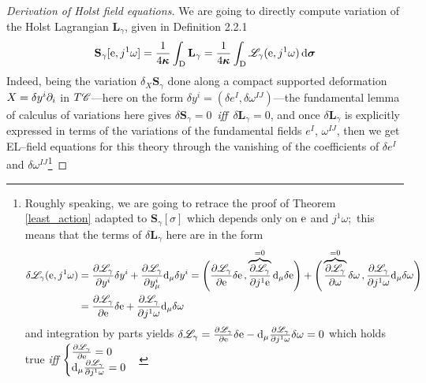 \begin{proof}[Derivation of Holst field equations]
    We are going to directly compute variation of the Holst Lagrangian $\mathbf{L}_\gamma$, given in Definition 2.2.1
    $$\mathbf{S}_\gamma[\text{\normalfont e},j^1\omega]=\frac{1}{4\boldsymbol{\kappa}}\int_{\text{\normalfont D}}\mathbf{L}_\gamma=\frac{1}{4\boldsymbol{\kappa}}\int_{\text{\normalfont D}}\mathscr{L}_\gamma(\text{\normalfont e},j^1\omega)\,\text{\normalfont d}\boldsymbol{\sigma}$$
    Indeed, being the variation $\delta_X\mathbf{S}_\gamma$ done along a compact supported deformation $X=\delta y^i\partial_i$ in $T\mathscr{C}$---here on the form $\delta y^i=\left(\delta e^I,\delta\omega^{IJ}\right)$---the fundamental lemma of calculus of variations here gives $\delta\mathbf{S}_\gamma=0$ \,\emph{iff}\, $\delta\mathbf{L}_\gamma=0$, and once $\delta\mathbf{L}_\gamma$ is explicitly expressed in terms of the variations of the fundamental fields $e^I$, $\omega^{IJ}$, then we get EL--field equations for this theory through the vanishing of the coefficients of $\delta e^I$ and $\delta\omega^{IJ}$\footnote{Roughly speaking, we are going to retrace the proof of Theorem \ref{least_action} adapted to $\mathbf{S}_\gamma[\sigma]$ which depends only on $\text{\normalfont e}$ and $j^1\omega$;\, this means that the terms of $\delta\mathbf{L}_\gamma$ here are in the form
    \begin{align*}
        \delta\mathscr{L}_\gamma(\text{\normalfont e},j^1\omega)&=\frac{\partial\mathscr{L}_\gamma}{\partial y^i}\delta y^i+\frac{\partial\mathscr{L}_\gamma}{\partial y^i_\mu}\text{\normalfont d}_\mu\delta y^i=\Bigg(\frac{\partial\mathscr{L}_\gamma}{\partial\text{\normalfont e}}\delta\text{\normalfont e}\,,\overbrace{\frac{\partial\mathscr{L}_\gamma}{\partial j^1\text{\normalfont e}}}^{=0}\text{\normalfont d}_\mu\delta\text{\normalfont e}\Bigg)+\Bigg(\overbrace{\frac{\partial\mathscr{L}_\gamma}{\partial\omega}}^{=0}\delta\omega\,,\frac{\partial\mathscr{L}_\gamma}{\partial j^1\omega}\text{\normalfont d}_\mu\delta\omega\Bigg)\\
        &=\frac{\partial\mathscr{L}_\gamma}{\partial\text{\normalfont e}}\delta\text{\normalfont e}+\frac{\partial\mathscr{L}_\gamma}{\partial j^1\omega}\text{\normalfont d}_\mu\delta\omega
    \end{align*}
    and integration by parts yields $\delta\mathscr{L}_\gamma=\frac{\partial\mathscr{L}_\gamma}{\partial\text{\normalfont e}}\delta\text{\normalfont e}-\text{\normalfont d}_\mu\frac{\partial\mathscr{L}_\gamma}{\partial j^1\omega}\delta\omega=0$ which holds true \emph{iff}
    $\begin{cases}
        \frac{\partial\mathscr{L}_\gamma}{\partial\text{\normalfont e}}=0\\
        \text{\normalfont d}_\mu\frac{\partial\mathscr{L}_\gamma}{\partial j^1\omega}=0
    \end{cases}$
    
}
\end{proof}
